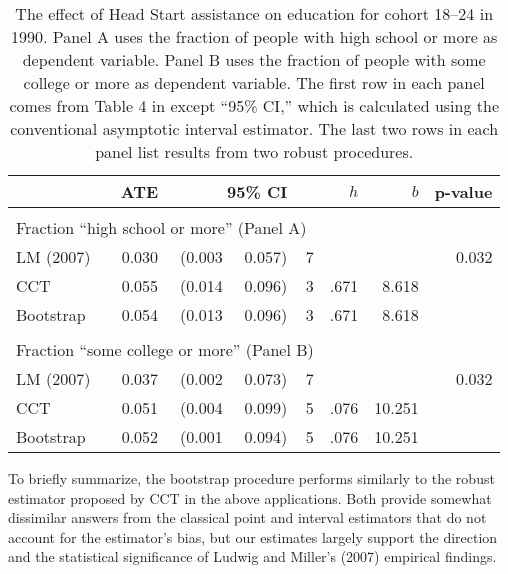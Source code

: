 \documentclass[12pt,fleqn]{article}
\begin{document}
\begin{table}[t]
  \centering
  \begin{tabular}{lrr@{, }rr@{}rrr}
    \toprule
              & ATE   & \multicolumn{2}{r}{95\% CI} & & $h$     & $b$ & p-value     \\
    \midrule                                                                          \\
    \multicolumn{5}{l}{Fraction ``high school or more'' (Panel A)}                    \\
    \midrule
    LM (2007) & 0.030 & (0.003                      & 0.057) & 7&     &  & 0.032    \\
    CCT       & 0.055 & (0.014                      & 0.096) & 3&.671 & 8.618       \\
    Bootstrap & 0.054 & (0.013                      & 0.096) & 3&.671 & 8.618       \\\\
    \multicolumn{5}{l}{Fraction ``some college or more'' (Panel B)}                   \\
    \midrule
    LM (2007) & 0.037 & (0.002                      & 0.073) & 7&     &  & 0.032 \T \\
    CCT       & 0.051 & (0.004                      & 0.099) & 5&.076 & 10.251      \\
    Bootstrap & 0.052 & (0.001                      & 0.094) & 5&.076 & 10.251      \\
    \bottomrule
  \end{tabular}
  \caption{The effect of Head Start assistance on education for cohort
    18--24 in 1990. Panel A uses the fraction of people with high school
    or more as dependent variable. Panel B uses the fraction of people
    with some college or more as dependent variable. The first row in
    each panel comes from Table 4 in \cite{ludwig2007} except ``95\% CI,''
    which is calculated using the conventional asymptotic interval estimator.
    The last two rows in
    each panel list results from two robust procedures.}
  \label{tbl:3}
\end{table}

To briefly summarize, the bootstrap procedure performs similarly to the robust
estimator proposed by CCT in the above applications. Both provide somewhat
dissimilar answers from the classical point and interval estimators that do
not account for the estimator's bias, but our estimates largely support the
direction and the statistical significance of Ludwig and Miller's (2007)
empirical findings.
\end{document}
